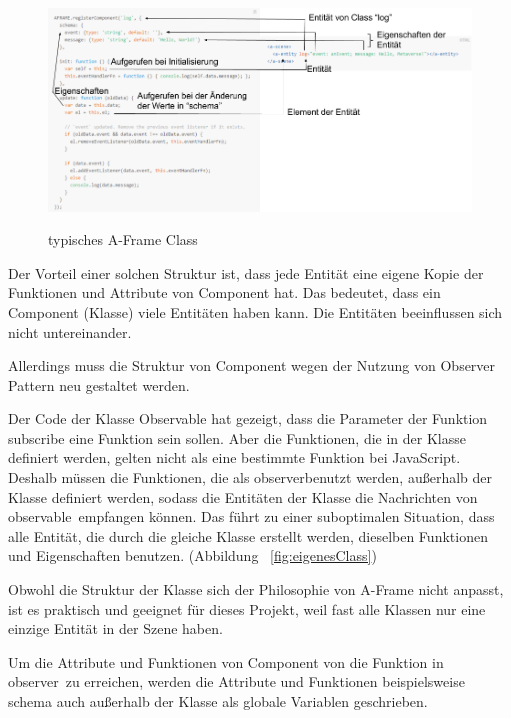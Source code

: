 \begin{figure}[ht]
\vspace*{1em}
\centering
\caption[Typisches A-Frame Class]{typisches A-Frame Class}
\includegraphics[width=\textwidth]{images/aframeClass.png}
\label{fig:aframeClass} 
\end{figure}
 
 Der Vorteil einer solchen Struktur ist, dass jede Entität eine eigene Kopie der Funktionen und Attribute von Component hat. Das bedeutet, dass ein Component (Klasse) viele Entitäten haben kann. Die Entitäten beeinflussen sich nicht untereinander.
 
 Allerdings muss die Struktur von Component wegen der Nutzung von Observer Pattern neu gestaltet werden.
 
 Der Code der Klasse {\selectfont Observable} hat gezeigt, dass die Parameter der Funktion {\selectfont subscribe} eine Funktion sein sollen. Aber die Funktionen, die in der Klasse definiert werden, gelten nicht als eine bestimmte Funktion bei JavaScript. Deshalb müssen die Funktionen, die als \glqq observer\grqq benutzt werden, außerhalb der Klasse definiert werden, sodass die Entitäten der Klasse die Nachrichten von \glqq observable\grqq\ empfangen können. Das führt zu einer suboptimalen Situation, dass alle Entität, die durch die gleiche Klasse erstellt werden, dieselben Funktionen und Eigenschaften benutzen. (Abbildung ~\ref{fig:eigenesClass})
 
 Obwohl die Struktur der Klasse sich der Philosophie von A-Frame nicht anpasst, ist es praktisch und geeignet für dieses Projekt, weil fast alle Klassen nur eine einzige Entität in der Szene haben.
 
 Um die Attribute und Funktionen von Component von die Funktion in \glqq observer\grqq\ zu erreichen, werden die Attribute und Funktionen beispielsweise {\selectfont schema} auch außerhalb der Klasse als globale Variablen geschrieben.
 
